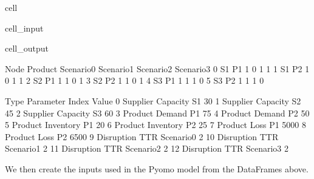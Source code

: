 \documentclass[letterpaper,10pt,english]{jupyterBook}
\begin{document}
\begin{sphinxuseclass}{cell}
\begin{sphinxVerbatimInput}
\begin{sphinxuseclass}{cell_input}
\begin{sphinxVerbatim}[commandchars=\\\{\}]
  
  

\end{sphinxVerbatim}

\end{sphinxuseclass}\end{sphinxVerbatimInput}
\begin{sphinxVerbatimOutput}

\begin{sphinxuseclass}{cell_output}
\begin{sphinxVerbatim}[commandchars=\\\{\}]
  Node Product  Scenario\PYGZus{}0  Scenario\PYGZus{}1  Scenario\PYGZus{}2  Scenario\PYGZus{}3
0   S1      P1           1           0           1           1
1   S1      P2           1           0           1           1
2   S2      P1           1           1           0           1
3   S2      P2           1           1           0           1
4   S3      P1           1           1           1           0
5   S3      P2           1           1           1           0
\end{sphinxVerbatim}

\begin{sphinxVerbatim}[commandchars=\\\{\}]
          Type  Parameter       Index  Value
0     Supplier   Capacity          S1     30
1     Supplier   Capacity          S2     45
2     Supplier   Capacity          S3     60
3      Product     Demand          P1     75
4      Product     Demand          P2     50
5      Product  Inventory          P1     20
6      Product  Inventory          P2     25
7      Product       Loss          P1   5000
8      Product       Loss          P2   6500
9   Disruption        TTR  Scenario\PYGZus{}0      2
10  Disruption        TTR  Scenario\PYGZus{}1      2
11  Disruption        TTR  Scenario\PYGZus{}2      2
12  Disruption        TTR  Scenario\PYGZus{}3      2
\end{sphinxVerbatim}

\end{sphinxuseclass}\end{sphinxVerbatimOutput}

\end{sphinxuseclass}
\sphinxAtStartPar
We then create the inputs used in the Pyomo model from the DataFrames above.
\end{document}
